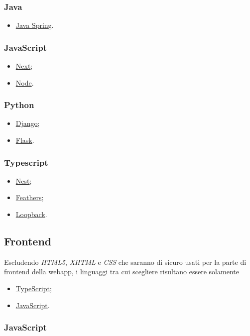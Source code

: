 \documentclass[a4paper, 12pt]{article}
\begin{document}
\subsubsection{Java}
\begin{itemize}
    \item \href{https://spring.io/}{Java Spring}.
\end{itemize}
\subsubsection{JavaScript}
\begin{itemize}
    \item \href{https://nextjs.org/}{Next};
    \item \href{https://nodejs.org/}{Node}.
\end{itemize}
\subsubsection{Python}
\begin{itemize}
    \item \href{https://www.djangoproject.com/}{Django};
    \item \href{https://flask.palletsprojects.com/}{Flask}.
\end{itemize}
\subsubsection{Typescript}
\begin{itemize}
    \item \href{https://nestjs.com/}{Nest};
    \item \href{https://feathersjs.com/}{Feathers};
    \item \href{https://loopback.io/}{Loopback}.
\end{itemize}
\subsection{Frontend}
Escludendo \textit{HTML5}, \textit{XHTML} e \textit{CSS} che saranno di sicuro usati per la parte di frontend della webapp, i linguaggi tra cui scegliere risultano essere solamente
\begin{itemize}
    \item \href{https://www.typescriptlang.org/}{TypeScript};
    \item \href{https://www.javascript.com/}{JavaScript}.
\end{itemize}
\subsubsection{JavaScript}
\end{document}
